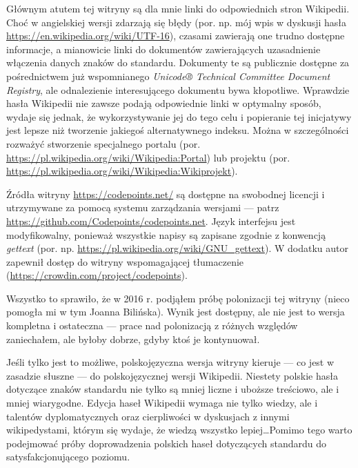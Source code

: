 
Głównym atutem tej witryny są dla mnie linki do odpowiednich stron
Wikipedii. Choć w angielskiej wersji zdarzają się błędy (por. np. mój
wpis w dyskusji hasła \url{https://en.wikipedia.org/wiki/UTF-16}),
czasami zawierają one trudno dostępne informacje, a mianowicie linki
do dokumentów zawierających uzasadnienie włączenia danych znaków do
standardu. Dokumenty te są publicznie dostępne za pośrednictwem już
wspomnianego \textit{Unicode® Technical Committee Document Registry},
ale odnalezienie interesującego dokumentu bywa kłopotliwe. Wprawdzie
hasła Wikipedii nie zawsze podają odpowiednie linki w optymalny
sposób, wydaje się jednak, że wykorzystywanie jej do tego celu i
popieranie tej inicjatywy jest lepsze niż tworzenie jakiegoś
alternatywnego indeksu. Można w szczególności rozważyć stworzenie
specjalnego portalu
(por. \url{https://pl.wikipedia.org/wiki/Wikipedia:Portal}) lub
projektu
(por. \url{https://pl.wikipedia.org/wiki/Wikipedia:Wikiprojekt}).


Źródła witryny \url{https://codepoints.net/} są dostępne na swobodnej
licencji i utrzymywane za pomocą systemu zarządzania wersjami ---
patrz \url{https://github.com/Codepoints/codepoints.net}. Język
interfejsu jest modyfikowalny, ponieważ wszystkie napisy są zapisane
zgodnie z konwencją \textit{gettext}
(por. np. \url{https://pl.wikipedia.org/wiki/GNU_gettext}). W dodatku
autor zapewnił dostęp do witryny wspomagającej tłumaczenie
(\url{https://crowdin.com/project/codepoints}).

Wszystko to sprawiło, że w 2016 r. podjąłem próbę polonizacji tej
witryny (nieco pomogła mi w tym Joanna Bilińska). Wynik jest dostępny,
ale nie jest to wersja kompletna i ostateczna --- prace nad
polonizacją z różnych względów zaniechałem, ale byłoby dobrze, gdyby
ktoś je kontynuował.

Jeśli tylko jest to możliwe, polskojęzyczna wersja witryny kieruje ---
co jest w zasadzie słuszne --- do polskojęzycznej wersji
Wikipedii. Niestety polskie hasła dotyczące znaków standardu nie tylko
są mniej liczne i uboższe treściowo, ale i mniej wiarygodne. Edycja
haseł Wikipedii wymaga nie tylko wiedzy, ale i talentów
dyplomatycznych oraz cierpliwości w dyskusjach z innymi wikipedystami,
którym się wydaje, że wiedzą wszystko lepiej\ldots Pomimo tego warto
podejmować próby doprowadzenia polskich haseł dotyczących standardu do
satysfakcjonującego poziomu.

